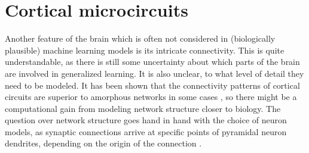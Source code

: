 

\section{Cortical microcircuits}

Another feature of the brain which is often not considered in (biologically plausible) machine learning models is its
intricate connectivity. This is quite understandable, as there is still some uncertainty about which parts of the brain
are involved in generalized learning. It is also unclear, to what level of detail they need to be modeled. It has been
shown that the connectivity patterns of cortical circuits are superior to amorphous networks in some cases
\citep{haeusler2007statistical}, so there might be a computational gain from modeling network structure closer to
biology. The question over network structure goes hand in hand with the choice of neuron models, as synaptic connections
arrive at specific points of pyramidal neuron dendrites, depending on the origin of the connection
\citep{felleman1991distributed,Ishizuka1995,Larkum2018}.

